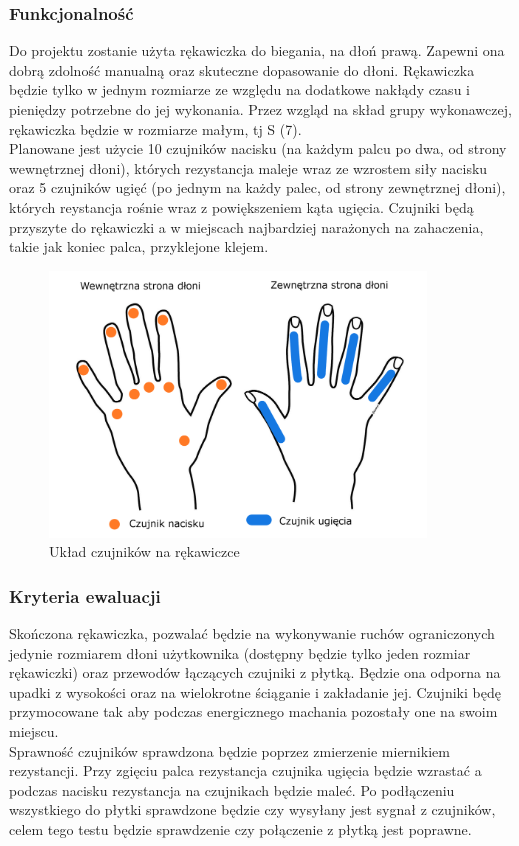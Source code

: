 \documentclass{article}
\begin{document}
\subsubsection{Funkcjonalność}
Do projektu zostanie użyta rękawiczka do biegania, na dłoń prawą. Zapewni ona dobrą zdolność manualną oraz skuteczne dopasowanie do dłoni. Rękawiczka będzie tylko w jednym rozmiarze ze względu na dodatkowe nakłądy czasu i pieniędzy potrzebne do jej wykonania. Przez wzgląd na skład grupy wykonawczej, rękawiczka będzie w rozmiarze małym, tj S (7).\\
Planowane jest użycie 10 czujników nacisku (na każdym palcu po dwa, od strony wewnętrznej dłoni), których rezystancja maleje wraz ze wzrostem siły nacisku oraz 5 czujników ugięć (po jednym na każdy palec, od strony zewnętrznej dłoni), których reystancja rośnie wraz z powiększeniem kąta ugięcia. Czujniki będą przyszyte do rękawiczki a w miejscach najbardziej narażonych na zahaczenia, takie jak koniec palca, przyklejone klejem. \\

\begin{figure}[h!]
\centering
\includegraphics[width = 10cm]{czujniki.png}
\caption{Układ czujników na rękawiczce}
\label{fig:rozmieszczenie_czujników}
\end{figure}

\subsubsection{Kryteria ewaluacji}
Skończona rękawiczka, pozwalać będzie na wykonywanie ruchów ograniczonych jedynie rozmiarem dłoni użytkownika (dostępny będzie tylko jeden rozmiar rękawiczki) oraz przewodów łączących czujniki z płytką. Będzie ona odporna na upadki z wysokości oraz na wielokrotne ściąganie i zakładanie jej. Czujniki będę przymocowane tak aby podczas energicznego machania pozostały one na swoim miejscu.\\
Sprawność czujników sprawdzona będzie poprzez zmierzenie miernikiem rezystancji. Przy zgięciu palca rezystancja czujnika ugięcia będzie wzrastać a podczas nacisku rezystancja na czujnikach będzie maleć. Po podłączeniu wszystkiego do płytki sprawdzone będzie czy wysyłany jest sygnał z czujników, celem tego testu będzie sprawdzenie czy połączenie z płytką jest poprawne.
\end{document}
